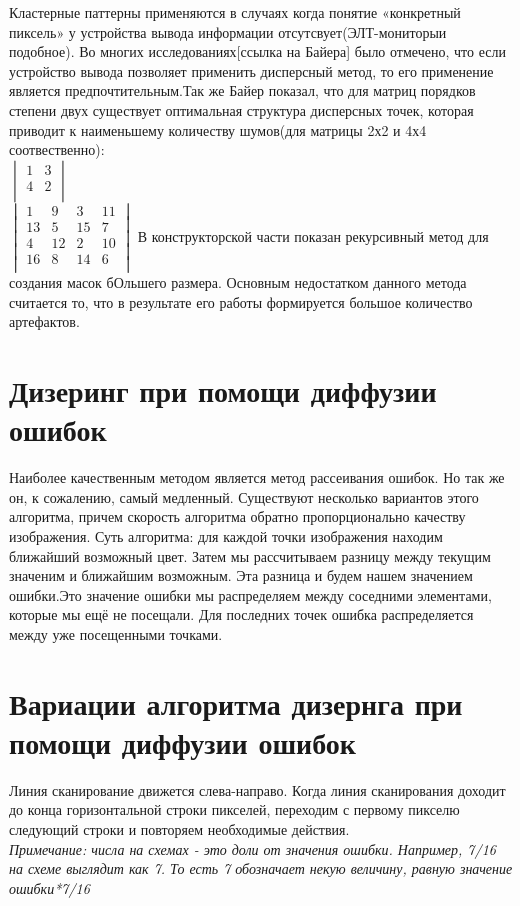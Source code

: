 Кластерные паттерны применяются в случаях когда понятие «конкретный пиксель» у устройства вывода информации отсутсвует(ЭЛТ-мониторыи подобное). Во многих исследованиях[ссылка на Байера] было отмечено, что если устройство вывода позволяет применить дисперсный метод, то его применение является предпочтительным.Так же Байер \cite{Bayer} показал, что для матриц порядков степени двух существует оптимальная структура дисперсных точек, которая приводит к наименьшему количеству шумов(для матрицы 2х2 и 4х4 соотвественно):\\
$\begin{vmatrix}
1 & 3 \\          
4 & 2   \\
\end{vmatrix}$
 \\
 $\begin{vmatrix}
1& 9& 3& 11\\
13& 5& 15& 7\\
4& 12& 2& 10\\
16& 8&14&6\\
\end{vmatrix}$
В конструкторской части показан рекурсивный метод для создания масок бОльшего размера. Основным недостатком данного метода считается то, что в результате его работы формируется большое количество артефактов.
\section{Дизеринг при помощи диффузии ошибок}
Наиболее качественным методом является метод рассеивания ошибок. Но так же он, к сожалению, самый медленный. Существуют несколько вариантов этого алгоритма, причем скорость алгоритма обратно пропорционально качеству изображения.
Суть алгоритма: для каждой точки изображения находим ближайший возможный цвет. Затем мы рассчитываем разницу между текущим значеним и ближайшим возможным. Эта разница и будем нашем значением ошибки.Это значение ошибки мы распределяем между соседними элементами, которые мы ещё не посещали. Для последних точек ошибка распределяется между уже посещенными точками.
\section{Вариации алгоритма дизернга при помощи диффузии ошибок}
Линия сканирование движется слева-направо. Когда линия сканирования доходит до конца горизонтальной строки пикселей, переходим с первому пикселю следующий строки и повторяем необходимые действия.\\
 \textit{Примечание: числа на схемах - это доли от значения  ошибки. Например, 7/16 на схеме выглядит как 7. То есть 7 обозначает некую величину, равную значение ошибки*7/16 }
